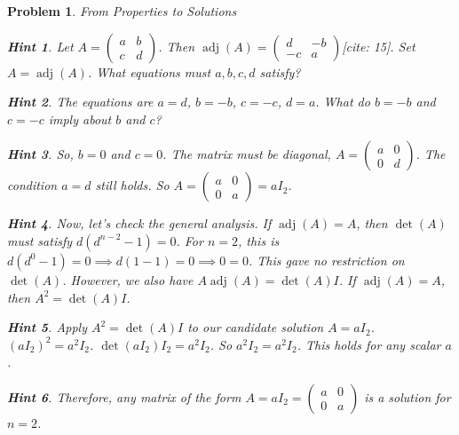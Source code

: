 \documentclass[12pt]{article}
\newtheorem{problem}{Problem}[section]
\theoremstyle{definition}
\newtheorem{hint}{Hint}[question]
\newcommand{\adj}{\operatorname{adj}}
\newcommand{\detm}{\operatorname{det}}
\begin{document}
\begin{problem}{From Properties to Solutions}
        \begin{hint}
             Let $A = \begin{pmatrix} a & b \\ c & d \end{pmatrix}$. Then $\adj(A) = \begin{pmatrix} d & -b \\ -c & a \end{pmatrix}$[cite: 15]. Set $A=\adj(A)$. What equations must $a,b,c,d$ satisfy?
        \end{hint}
         \begin{hint}
              The equations are $a=d$, $b=-b$, $c=-c$, $d=a$. What do $b=-b$ and $c=-c$ imply about $b$ and $c$?
         \end{hint}
         \begin{hint}
              So, $b=0$ and $c=0$. The matrix must be diagonal, $A=\begin{pmatrix} a & 0 \\ 0 & d \end{pmatrix}$. The condition $a=d$ still holds. So $A=\begin{pmatrix} a & 0 \\ 0 & a \end{pmatrix} = aI_2$.
         \end{hint}
         \begin{hint}
              Now, let's check the general analysis. If $\adj(A)=A$, then $\detm(A)$ must satisfy $d(d^{n-2}-1)=0$. For $n=2$, this is $d(d^0-1)=0 \implies d(1-1)=0 \implies 0=0$. This gave no restriction on $\detm(A)$.
              However, we also have $A\adj(A)=\detm(A)I$. If $\adj(A)=A$, then $A^2 = \detm(A)I$.
         \end{hint}
         \begin{hint}
             Apply $A^2 = \detm(A)I$ to our candidate solution $A=aI_2$.
             $(aI_2)^2 = a^2 I_2$.
             $\detm(aI_2) I_2 = a^2 I_2$.
             So $a^2 I_2 = a^2 I_2$. This holds for any scalar $a$.
         \end{hint}
         \begin{hint}
              Therefore, any matrix of the form $A=aI_2 = \begin{pmatrix} a & 0 \\ 0 & a \end{pmatrix}$ is a solution for $n=2$.
         \end{hint}
    


\end{problem}
\end{document}
